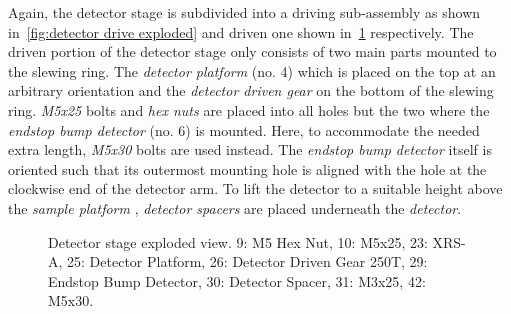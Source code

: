             Again, the detector stage is subdivided into a driving sub-assembly as shown in~\cref{fig:detector drive exploded} and driven one shown in~\cref{fig:detector stage exploded} respectively.
            The driven portion of the detector stage only consists of two main parts mounted to the slewing ring.
            The \textit{detector platform} (no. 4) which is placed on the top at an arbitrary orientation and the \textit{detector driven gear} on the bottom of the slewing ring.
            \textit{M5x25} bolts and \textit{hex nuts} are placed into all holes but the two where the \textit{endstop bump detector} (no. 6) is mounted.
            Here, to accommodate the needed extra length, \textit{M5x30} bolts are used instead.
            The \textit{endstop bump detector} itself is oriented such that its outermost mounting hole is aligned with the hole at the clockwise end of the detector arm.
            To lift the detector to a suitable height above the \textit{sample platform }, \textit{detector spacers} are placed underneath the \textit{detector}.\par\medskip
            \begin{figure}[t]
                \centering
                \caption[Detector stage exploded view.]{Detector stage exploded view. 9: M5 Hex Nut, 10: M5x25, 23: XRS-A, 25: Detector Platform, 26: Detector Driven Gear 250T, 29: Endstop Bump Detector, 30: Detector Spacer, 31: M3x25, 42: M5x30.}%
                \label{fig:detector stage exploded}%
            \end{figure}
            
